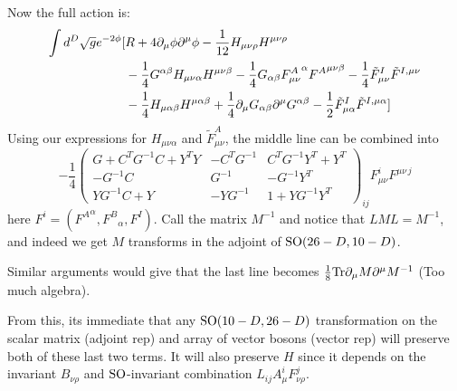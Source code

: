 \documentclass[11pt, class=article, crop=false]{standalone}
\begin{document}
\begin{enumerate}
	Now the full action is:
	\[
	\begin{aligned}
		\int d^D \sqrt{g} e^{-2\phi} [&R + 4 \partial_\mu \phi \partial^\mu \phi  -\frac{1}{12} H_{\mu \nu \rho} H^{\mu \nu \rho}\\
		& 
		- \frac{1}{4} G^{\alpha \beta} H_{\mu \nu \alpha} H^{\mu \nu \beta} - \frac14 G_{\alpha \beta} {F^{A}_{\mu \nu}}^{\alpha} {F^A}^{\mu \nu \beta}  -\frac14 \tilde F^{I}_{\mu \nu} \tilde F^{I, \mu \nu} \\
		&  - \frac{1}{4} H_{\mu \alpha \beta} H^{\mu \alpha \beta} + \frac14 \partial_\mu G_{\alpha \beta} \partial^\mu G^{\alpha \beta} - \frac{1}{2} \tilde F^{I}_{\mu \alpha} \tilde F^{I, \mu \alpha}]
	\end{aligned}
	\] 
	Using our expressions for $H_{\mu \nu \alpha}$ and $\tilde F_{\mu \nu}^A$, the middle line can be combined into
	\[
		-\frac14 \begin{pmatrix}
			G + C^T G^{-1} C + Y^T Y & -C^T G^{-1}  &  C^T G^{-1} Y^T + Y^T\\
			-G^{-1} C & G^{-1} & -G^{-1} Y^T  \\ 
			Y G^{-1} C + Y & -Y G^{-1} & 1 + Y G^{-1} Y^T
		\end{pmatrix}_{ij} F_{\mu \nu}^i F^{\mu \nu\, j}
	\]
	here $F^i = ({F^A}^\alpha, {F^B}_\alpha, F^I)$. Call the matrix $M^{-1}$ and notice that $L M L = M^{-1}$, and indeed we get $M$ transforms in the adjoint of $\mathrm{SO}(26-D, 10-D)$. 
	
	Similar arguments would give that the last line becomes $\frac18 \mathrm{Tr} \partial_\mu M \partial^\mu M^{-1}$ (Too much algebra).
	
	From this, its immediate that any $\mathrm{SO}(10-D, 26-D)$ transformation on the scalar matrix (adjoint rep) and array of vector bosons (vector rep) will preserve both of these last two terms. It will also preserve $H$ since it depends on the invariant $B_{\nu \rho}$ and $\mathrm{SO}$-invariant combination $L_{ij} A^i_\mu F_{\nu \rho}^j$. 
	

\end{enumerate}
\end{document}
